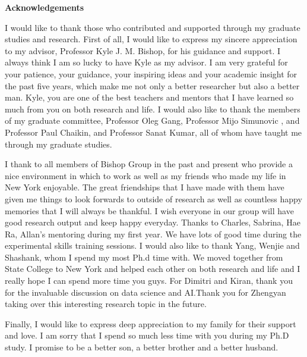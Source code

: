 
\clearpage
\begin{center}

\vspace*{1\baselineskip}
\textbf{\large Acknowledgements}
\end{center}

\hspace{10mm}I would like to thank those who contributed and supported through my graduate studies and research. First of all, I would like to express my sincere appreciation to
my advisor, Professor Kyle J. M. Bishop, for his guidance and support. I always think I am so lucky to have Kyle as my advisor. I am very grateful for your  patience, your guidance, your inspiring ideas and your academic insight  for the past five years, which make me not only a better researcher but also a better man. Kyle, you are one of the best teachers and mentors that I have learned so much from you on both research and life. I would also like to thank the members of my graduate
committee, Professor Oleg Gang, Professor Mijo Simunovic , and Professor Paul Chaikin, and Professor Sanat Kumar, all of whom have taught me through my graduate studies.

I thank to  all members of Bishop Group in the past and present who provide a nice environment in which to work as well as my friends who made my life in New York enjoyable. The
great friendships that I have made with them have given me things to look forwards to outside of
research as well as countless happy memories that I will always be thankful. I wish everyone in our group will have good research output and keep happy everyday. Thanks to Charles, Sabrina, Hae Ra,  Allan's mentoring during my first year. We have lots of good time during the experimental skills training sessions. I would also like to thank Yang, Wenjie and Shashank, whom I spend my most Ph.d time with. We moved together from State College to New York and helped each other on both research and life and I really hope I can spend more time you guys.  For Dimitri and Kiran, thank you for the invaluable discussion on data science and AI.Thank you for Zhengyan taking over this interesting research topic in the future.

Finally, I would like to express deep appreciation to my family for their support and love. I am sorry that I spend so much less time with you during my Ph.D study. I promise to be a better son, a better brother and a better husband. 
\clearpage

 

